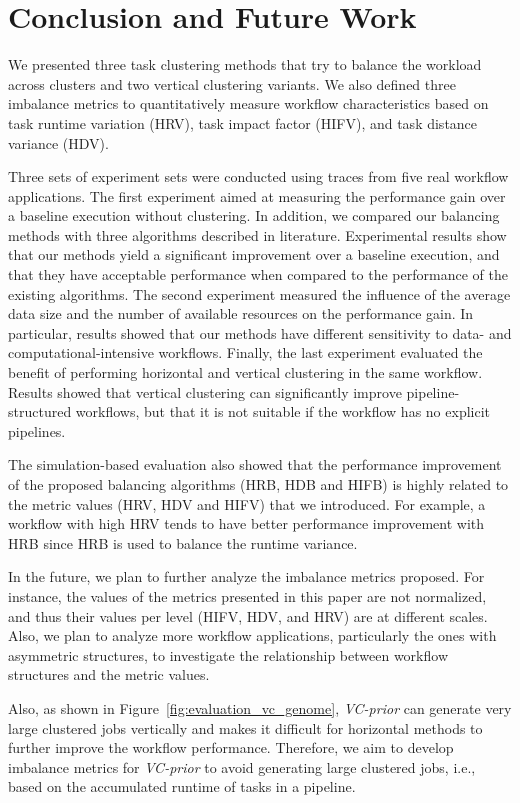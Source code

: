 \section{Conclusion and Future Work}

We presented three {task clustering methods that try to balance the workload across clusters and two vertical clustering variants. }We also defined three imbalance metrics to quantitatively measure workflow characteristics based on task runtime variation (HRV), task impact factor (HIFV), and task distance variance (HDV).

Three {sets of }experiment sets were conducted using traces from five real workflow applications. The first experiment aimed at measuring the performance gain over a baseline execution without clustering. In addition, we compared our balancing methods with three algorithms {described }in literature. Experimental results show that our methods yield {a }significant improvement over a baseline execution, and that they have acceptable performance when compared to {the }performance of the existing algorithms. The second experiment measured the influence of {the }average data size and {the }number of available resources on the performance gain. In particular, results show{ed }that our methods have different sensitivity to data- and computational-intensive workflows. Finally, the last experiment evaluated the {benefit }of performing horizontal and vertical clustering in the same workflow. Results show{ed }that vertical clustering can significantly improve pipeline-structured workflows, {but that }it is not suitable if the workflow has no explicit pipelines.

The simulation{-}based evaluation also show{ed }that the performance improvement of the proposed balancing algorithms (HRB, HDB and HIFB) is highly related to the metric values (HRV, HDV and HIFV) that we introduced. For example, a workflow with high HRV tends to have better performance improvement with HRB since HRB is used to balance the runtime variance. 

In the future, we plan to further analyze the imbalance metrics proposed. For instance, the values of {the }metrics presented in this paper are not normalized, and thus their values per level (HIFV, HDV, and HRV) are {at }different scales. Also, we plan to analyze more workflow applications, particularly the ones with asymmetric structures, to investigate the relationship between workflow structures and the metric values. 

Also, as shown in Figure~\ref{fig:evaluation_vc_genome}, \emph{VC-prior} can generate very large clustered jobs vertically and makes it difficult for horizontal methods to {further improve the workflow performance. }Therefore, we aim to develop imbalance metrics for \emph{VC-prior} to avoid generating large clustered jobs, i.e., based on the accumulated runtime of tasks in a pipeline. 

